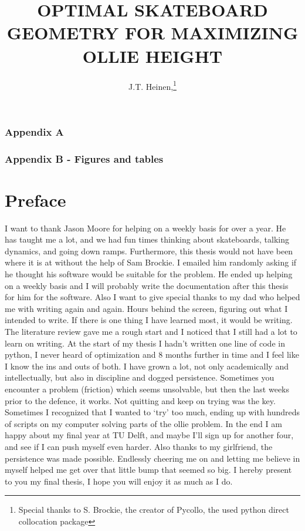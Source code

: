 \documentclass[twocolumn,10pt,twoside]{asme2ej}
\title{OPTIMAL SKATEBOARD GEOMETRY FOR MAXIMIZING OLLIE HEIGHT}
\author{J.T. Heinen,\thanks{Special thanks to S. Brockie, the creator of Pycollo, the used python direct collocation package} \\
    \affiliation{
	Bicycle Laboratory\\
	Department of Mechanical Engineering\\
	Technical University of Delft\\
	Delft, The Netherlands, 2611CC\\
    Email: janheinen97@gmail.com
    }
}
\begin{document}

\onecolumn
\thispagestyle{plain}

\tableofcontents
\subsubsection*{Appendix A}

\subsubsection*{Appendix B - Figures and tables}
\newpage

\listoffigures
\listoftables
\thispagestyle{plain}
\newpage
\thispagestyle{plain}
\section*{Preface}
I want to thank Jason Moore for helping on a weekly basis for over a year. He has taught me a lot, and we had fun times thinking about skateboards, talking dynamics, and going down ramps. Furthermore, this thesis would not have been where it is at without the help of Sam Brockie. I emailed him randomly asking if he thought his software would be suitable for the problem. He ended up helping on a weekly basis and I will probably write the documentation after this thesis for him for the software. Also I want to give special thanks to my dad who helped me with writing again and again. Hours behind the screen, figuring out what I intended to write. If there is one thing I have learned most, it would be writing. The literature review gave me a rough start and I noticed that I still had a lot to learn on writing. At the start of my thesis I hadn't written one line of code in python, I never heard of optimization and 8 months further in time and I feel like I know the ins and outs of both. I have grown a lot, not only academically and intellectually, but also in discipline and dogged persistence. Sometimes you encounter a problem (friction) which seems unsolvable, but then the last weeks prior to the defence, it works. Not quitting and keep on trying was the key. Sometimes I recognized that I wanted to `try' too much, ending up with hundreds of scripts on my computer solving parts of the ollie problem. In the end I am happy about my final year at TU Delft, and maybe I'll sign up for another four, and see if I can push myself even harder. Also thanks to my girlfriend, the persistence was made possible. Endlessly cheering me on and letting me believe in myself helped me get over that little bump that seemed so big. I hereby present to you my final thesis, I hope you will enjoy it as much as I do.
\end{document}
